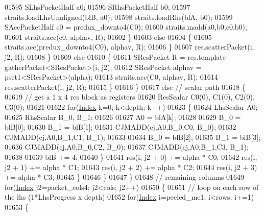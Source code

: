 \begin{DoxyCode}
01595                 SLhsPacketHalf a0;
01596                 SRhsPacketHalf b0;
01597                 straits.loadLhsUnaligned(blB, a0);
01598                 straits.loadRhs(blA, b0);
01599                 SAccPacketHalf c0 = predux\_downto4(C0);
01600                 straits.madd(a0,b0,c0,b0);
01601                 straits.acc(c0, alphav, R);
01602               \}
01603               \textcolor{keywordflow}{else}
01604               \{
01605                 straits.acc(predux\_downto4(C0), alphav, R);
01606               \}
01607               res.scatterPacket(i, j2, R);
01608             \}
01609             \textcolor{keywordflow}{else}
01610             \{
01611               SResPacket R = res.template gatherPacket<SResPacket>(i, j2);
01612               SResPacket alphav = pset1<SResPacket>(alpha);
01613               straits.acc(C0, alphav, R);
01614               res.scatterPacket(i, j2, R);
01615             \}
01616           \}
01617           \textcolor{keywordflow}{else} \textcolor{comment}{// scalar path}
01618           \{
01619             \textcolor{comment}{// get a 1 x 4 res block as registers}
01620             ResScalar C0(0), C1(0), C2(0), C3(0);
01621 
01622             \textcolor{keywordflow}{for}(\hyperlink{namespace_eigen_a62e77e0933482dafde8fe197d9a2cfde}{Index} k=0; k<depth; k++)
01623             \{
01624               LhsScalar A0;
01625               RhsScalar B\_0, B\_1;
01626 
01627               A0 = blA[k];
01628 
01629               B\_0 = blB[0];
01630               B\_1 = blB[1];
01631               CJMADD(cj,A0,B\_0,C0,  B\_0);
01632               CJMADD(cj,A0,B\_1,C1,  B\_1);
01633               
01634               B\_0 = blB[2];
01635               B\_1 = blB[3];
01636               CJMADD(cj,A0,B\_0,C2,  B\_0);
01637               CJMADD(cj,A0,B\_1,C3,  B\_1);
01638               
01639               blB += 4;
01640             \}
01641             res(i, j2 + 0) += alpha * C0;
01642             res(i, j2 + 1) += alpha * C1;
01643             res(i, j2 + 2) += alpha * C2;
01644             res(i, j2 + 3) += alpha * C3;
01645           \}
01646         \}
01647       \}
01648       \textcolor{comment}{// remaining columns}
01649       \textcolor{keywordflow}{for}(\hyperlink{namespace_eigen_a62e77e0933482dafde8fe197d9a2cfde}{Index} j2=packet\_cols4; j2<cols; j2++)
01650       \{
01651         \textcolor{comment}{// loop on each row of the lhs (1*LhsProgress x depth)}
01652         \textcolor{keywordflow}{for}(\hyperlink{namespace_eigen_a62e77e0933482dafde8fe197d9a2cfde}{Index} i=peeled\_mc1; i<rows; i+=1)
01653         \{

\end{DoxyCode}
